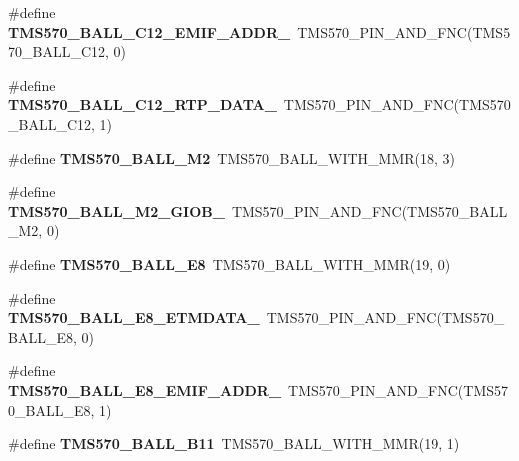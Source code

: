 \begin{DoxyCompactItemize}
\#define {\bfseries T\+M\+S570\+\_\+\+B\+A\+L\+L\+\_\+\+C12\+\_\+\+E\+M\+I\+F\+\_\+\+A\+D\+D\+R\+\_}~T\+M\+S570\+\_\+\+P\+I\+N\+\_\+\+A\+N\+D\+\_\+\+F\+NC(T\+M\+S570\+\_\+\+B\+A\+L\+L\+\_\+\+C12, 0)
\item 
\mbox{\label{tms570ls3137zwt-pins_8h_a77b1f38e4839050e6e7537f3f219c4fd}} 
\#define {\bfseries T\+M\+S570\+\_\+\+B\+A\+L\+L\+\_\+\+C12\+\_\+\+R\+T\+P\+\_\+\+D\+A\+T\+A\+\_}~T\+M\+S570\+\_\+\+P\+I\+N\+\_\+\+A\+N\+D\+\_\+\+F\+NC(T\+M\+S570\+\_\+\+B\+A\+L\+L\+\_\+\+C12, 1)
\item 
\mbox{\label{tms570ls3137zwt-pins_8h_a92a305239bc80a091f7da968ca0ac7f6}} 
\#define {\bfseries T\+M\+S570\+\_\+\+B\+A\+L\+L\+\_\+\+M2}~T\+M\+S570\+\_\+\+B\+A\+L\+L\+\_\+\+W\+I\+T\+H\+\_\+\+M\+MR(18, 3)
\item 
\mbox{\label{tms570ls3137zwt-pins_8h_a6a4de3280f450ed936a1f16ef60f3079}} 
\#define {\bfseries T\+M\+S570\+\_\+\+B\+A\+L\+L\+\_\+\+M2\+\_\+\+G\+I\+O\+B\+\_}~T\+M\+S570\+\_\+\+P\+I\+N\+\_\+\+A\+N\+D\+\_\+\+F\+NC(T\+M\+S570\+\_\+\+B\+A\+L\+L\+\_\+\+M2, 0)
\item 
\mbox{\label{tms570ls3137zwt-pins_8h_aa6822761c614c984df1bd994c5e622f3}} 
\#define {\bfseries T\+M\+S570\+\_\+\+B\+A\+L\+L\+\_\+\+E8}~T\+M\+S570\+\_\+\+B\+A\+L\+L\+\_\+\+W\+I\+T\+H\+\_\+\+M\+MR(19, 0)
\item 
\mbox{\label{tms570ls3137zwt-pins_8h_a8d7d413457735c51e4af73169cdf110e}} 
\#define {\bfseries T\+M\+S570\+\_\+\+B\+A\+L\+L\+\_\+\+E8\+\_\+\+E\+T\+M\+D\+A\+T\+A\+\_}~T\+M\+S570\+\_\+\+P\+I\+N\+\_\+\+A\+N\+D\+\_\+\+F\+NC(T\+M\+S570\+\_\+\+B\+A\+L\+L\+\_\+\+E8, 0)
\item 
\mbox{\label{tms570ls3137zwt-pins_8h_aa661ca0305b9a36bf61ce3a7890aeefd}} 
\#define {\bfseries T\+M\+S570\+\_\+\+B\+A\+L\+L\+\_\+\+E8\+\_\+\+E\+M\+I\+F\+\_\+\+A\+D\+D\+R\+\_}~T\+M\+S570\+\_\+\+P\+I\+N\+\_\+\+A\+N\+D\+\_\+\+F\+NC(T\+M\+S570\+\_\+\+B\+A\+L\+L\+\_\+\+E8, 1)
\item 
\mbox{\label{tms570ls3137zwt-pins_8h_ae5cd5f3965443cbf2e7e7d7e1debe500}} 
\#define {\bfseries T\+M\+S570\+\_\+\+B\+A\+L\+L\+\_\+\+B11}~T\+M\+S570\+\_\+\+B\+A\+L\+L\+\_\+\+W\+I\+T\+H\+\_\+\+M\+MR(19, 1)

\end{DoxyCompactItemize}
